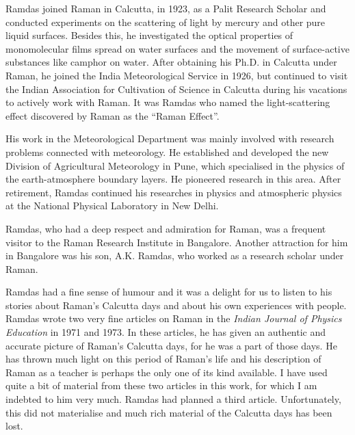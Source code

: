 \medskip
{}
\smallskip

\noindent
Ramdas joined Raman in Calcutta, in 1923, as a Palit Research Scho\-lar and conducted experiments on the scattering of light by mercury and other pure liquid surfaces. Besides this, he investigated the optical properties of monomolecular films spread on water surfaces and the movement of surface-active substances like camphor on water. After obtaining his Ph.D. in Calcutta under Raman, he joined the \hbox{India} Meteorological Service in 1926, but continued to visit the \hbox{Indian} Association for Cultivation of Science in Calcutta during his vacations to actively work with Raman. It was Ramdas who named the light-scattering effect discovered by Raman as the ``Raman Effect''.

His work in the Meteorological Department was mainly involved with research problems connected with meteorology. He established and developed the new Division of Agricultural Meteorology in Pune, which specialised in the physics of the earth-atmosphere boundary layers. He pioneered research in this area. After retirement, Ramdas continued his researches in physics and atmospheric physics at the National Physical Laboratory in New Delhi.

Ramdas, who had a deep respect and admiration for Raman, was a frequent visitor to the Raman Research Institute in Bangalore. Another attraction for him in Bangalore was his son, A.K. Ramdas, who worked as a research scholar under Raman.

Ramdas had a fine sense of humour and it was a delight for us to listen to his stories about Raman's Calcutta days and about his own experiences with people. Ramdas wrote two very fine articles on Raman in the {\em Indian Journal of Physics Education} in 1971 and 1973. In these articles, he has given an authentic and accurate picture of Raman's Calcutta days, for he was a part of those days. He has thrown much light on this period of Raman's life and his description of Raman as a teacher is perhaps the only one of its kind available. I have used quite a bit of material from these two articles in this work, for which I am indebted to him very much. Ramdas had planned a third article. Unfortunately, this did not materialise and much rich material of the Calcutta days has been lost.

\medskip
{}
\smallskip

